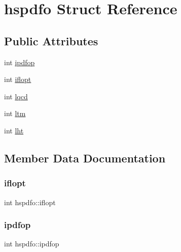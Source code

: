 \hypertarget{structhspdfo}{}\section{hspdfo Struct Reference}
\label{structhspdfo}
\subsection*{Public Attributes}
\begin{DoxyCompactItemize}
\item 
int \hyperlink{structhspdfo_a6b3c035f9b57f531292abc59c94ec3e2}{ipdfop}
\item 
int \hyperlink{structhspdfo_af9e5dbb23b3d56b7b5d35bcd26dc9ea0}{iflopt}
\item 
int \hyperlink{structhspdfo_abb1f8dc8af851ad19309f43c5fa6bd31}{lqcd}
\item 
int \hyperlink{structhspdfo_a1b51281dd57ff985568b4c7ca851231e}{ltm}
\item 
int \hyperlink{structhspdfo_a74349c5525a83652d071d75c6af7e4f5}{lht}
\end{DoxyCompactItemize}


\subsection{Member Data Documentation}
\mbox{\label{structhspdfo_af9e5dbb23b3d56b7b5d35bcd26dc9ea0}} 
\subsubsection{\texorpdfstring{iflopt}{iflopt}}
{\footnotesize\ttfamily int hspdfo\+::iflopt}

\mbox{\label{structhspdfo_a6b3c035f9b57f531292abc59c94ec3e2}} 
\subsubsection{\texorpdfstring{ipdfop}{ipdfop}}
{\footnotesize\ttfamily int hspdfo\+::ipdfop}

\mbox{\label{structhspdfo_a74349c5525a83652d071d75c6af7e4f5}} 

